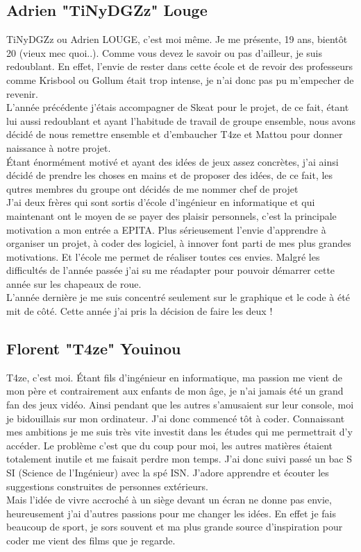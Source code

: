 \documentclass [11pt]{report}
\begin{document}
		\subsection {Adrien "TiNyDGZz" Louge}
			TiNyDGZz ou Adrien LOUGE, c'est moi même. Je me présente, 19 ans, bientôt 20 (vieux mec quoi..). Comme vous devez le savoir ou pas d'ailleur, je suis redoublant. En effet, l'envie de rester dans cette école et de revoir des professeurs comme Krisbool ou Gollum était trop intense, je n'ai donc pas pu m'empecher de revenir.\\
			 L'année précédente j'étais accompagner de Skeat pour le projet, de ce fait, étant lui aussi redoublant et ayant l'habitude de travail de groupe ensemble, nous avons décidé de nous remettre ensemble et d'embaucher T4ze et Mattou pour donner naissance à notre projet.\\
			 Étant énormément motivé et ayant des idées de jeux assez concrètes, j'ai ainsi décidé de prendre les choses en mains et de proposer des idées, de ce fait, les qutres membres du groupe ont décidés de me nommer chef de projet\\
			 J'ai deux frères qui sont sortis d'école d'ingénieur en informatique et qui maintenant ont le moyen de se payer des plaisir personnels, c'est la principale motivation a mon entrée a EPITA. Plus sérieusement l'envie d'apprendre à organiser un projet, à coder des logiciel, à innover font parti de mes plus grandes motivations. Et l'école me permet de réaliser toutes ces envies. Malgré les difficultés de l'année passée j'ai su me réadapter pour pouvoir démarrer cette année sur les chapeaux de roue. \\
			 L'année dernière je me suis concentré seulement sur le graphique et le code à été mit de côté. Cette année j'ai pris la décision de faire les deux !\\\vspace{10mm}
	
\newpage 

		\subsection {Florent "T4ze" Youinou}
		T4ze, c’est moi. \'Etant fils d’ingénieur en informatique, ma passion me vient de mon père et contrairement aux enfants de mon âge, je n’ai jamais été un grand fan des jeux vidéo. Ainsi pendant que les autres s’amusaient sur leur console, moi je bidouillais sur mon ordinateur. J’ai donc commencé tôt à coder. Connaissant mes ambitions je me suis très vite investit dans les études qui me permettrait d’y accéder. Le problème c’est que du coup pour moi, les autres matières étaient totalement inutile et me faisait perdre mon temps. J’ai donc suivi passé un bac S SI (Science de l’Ingénieur) avec la spé ISN. J’adore apprendre et écouter les suggestions construites de personnes extérieurs.\\
\indent Mais l’idée de vivre accroché à un siège devant un écran ne donne pas envie, heureusement j’ai d’autres passions pour me changer les idées. En effet je fais beaucoup de sport, je sors souvent et ma plus grande source d’inspiration pour coder me vient des films que je regarde.\\\vspace{10mm}
\end{document}
